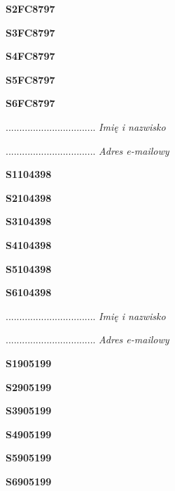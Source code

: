 \Large \textbf{S2FC8797}

\Large \textbf{S3FC8797}

\Large \textbf{S4FC8797}

\Large \textbf{S5FC8797}

\Large \textbf{S6FC8797}

.................................
\textit{Imię i nazwisko}

.................................
\textit{Adres e-mailowy}

\Large \textbf{S1104398}

\Large \textbf{S2104398}

\Large \textbf{S3104398}

\Large \textbf{S4104398}

\Large \textbf{S5104398}

\Large \textbf{S6104398}

.................................
\textit{Imię i nazwisko}

.................................
\textit{Adres e-mailowy}

\Large \textbf{S1905199}

\Large \textbf{S2905199}

\Large \textbf{S3905199}

\Large \textbf{S4905199}

\Large \textbf{S5905199}

\Large \textbf{S6905199}